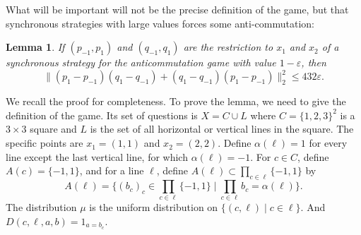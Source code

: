 \documentclass[10pt]{amsart}
\let\ts\textstyle
\theoremstyle{plain}
\newtheorem{lemma}[theorem]{Lemma}
\theoremstyle{definition}
\begin{document}
What will be important will not be the precise definition of the game, but that synchronous strategies with large values forces some anti-commutation:
\begin{lemma}\cite{MagicSquare}\label{lem:magic-square} If $(p_{-1},p_1)$ and $(q_{-1},q_1)$ are the restriction to $x_1$ and $x_2$ of a synchronous strategy for the anticommutation game with value $1-\varepsilon$, then
\[
\|(p_1-p_{-1})(q_1-q_{-1})+ (q_1-q_{-1})(p_1-p_{-1})\|_2^2 \leq 432 \varepsilon.
\]
\end{lemma}
We recall the proof for completeness. To prove the lemma, we need to give the definition of the game. Its set of questions is $X = C \cup L$ where $C=\{1,2,3\}^2$ is a $3\times 3$ square and $L$ is the set of all horizontal or vertical lines in the square. The specific points are $x_1=(1,1)$ and $x_2 = (2,2)$. Define $\alpha(\ell)=1$ for every line except the last vertical line, for which $\alpha(\ell)=-1$. For $c\in C$, define $A(c) = \{-1,1\}$, and for a line $\ell$, define $A(\ell) \subset \prod_{c \in \ell} \{-1,1\}$ by
\[\ts
A(\ell) = \bigl\{(b_c)_c \in \prod_{c\in \ell} \{-1,1\} \mid \prod_{c\in \ell} b_c=\alpha(\ell)\bigr\}.
\]
The distribution $\mu$ is the uniform distribution on $\{(c,\ell) \mid c \in \ell\}$. And $D(c,\ell,a,b) =1_{a=b_c}$.
\end{document}
